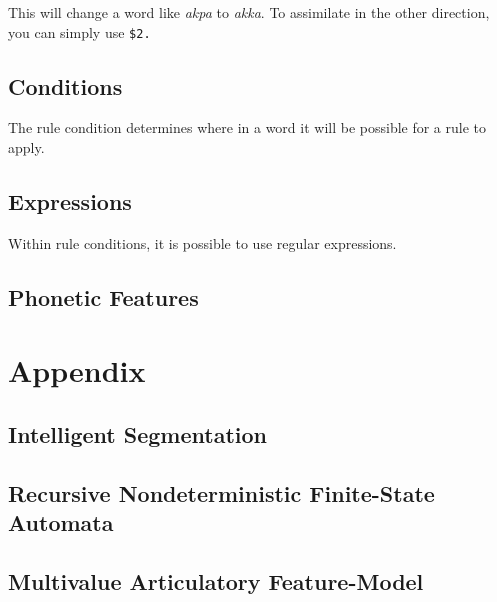 \documentclass[10pt,letterpaper]{article}
\begin{document}
\noindent
This will change a word like \emph{akpa} to \emph{akka}. %
To assimilate in the other direction, you can simply use \texttt{\$2.}

\subsection{Conditions}\label{sec:conditions}
The rule condition determines where in a word it will be possible for a rule to apply.

\subsection{Expressions}\label{sec:expressions}
Within rule conditions, it is possible to use regular expressions.

\subsection{Phonetic Features}\label{sec:features}

\section{Appendix}\label{sec:appendix}

\subsection{Intelligent Segmentation}\label{sec:segmentation}

\subsection{Recursive Nondeterministic Finite-State Automata}\label{sec:rndfa}

\subsection{Multivalue Articulatory Feature-Model}\label{sec:mafm}
\end{document}
